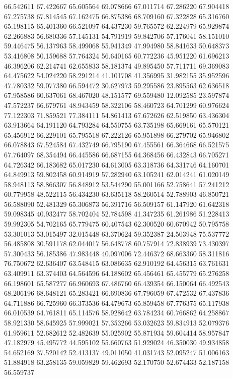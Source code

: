 66.542611
67.422667
65.605564
69.078666
67.011714
67.286220
67.904418
67.275738
67.814545
67.162475
66.875386
68.709160
67.322828
65.316760
65.198115
65.401360
66.521097
64.437230
59.765572
62.224979
65.929874
62.266883
56.680336
57.145131
54.791919
59.842706
57.176041
58.151010
59.446475
56.137963
58.499068
55.941349
47.994980
58.841633
50.648373
53.416808
50.159688
57.764324
56.640165
60.772236
45.951220
61.696213
46.396206
62.214741
62.655833
58.181374
49.895450
57.711711
69.369083
64.475622
54.024220
58.291214
41.101708
41.356995
31.982155
35.952596
47.780332
59.077380
66.594472
30.627973
59.295586
23.895563
62.636518
67.958586
60.637061
68.467020
48.151577
69.559480
12.092585
23.597874
47.572237
66.679761
48.943459
58.322106
58.460723
64.701299
60.976624
77.122303
71.859521
77.384111
54.861413
67.672626
62.519850
63.436304
63.913664
64.191120
64.793284
64.550755
63.735198
65.669161
65.570121
65.456912
66.229101
65.795518
67.222126
65.951898
66.279702
65.946802
66.078843
67.524584
67.432749
66.795190
67.455561
66.364668
66.521575
67.764097
68.354494
66.445586
66.687155
64.368456
66.432843
66.705271
64.726342
66.183682
65.017230
64.613005
63.318736
64.331746
64.160701
64.849913
59.802458
60.914919
57.282940
63.105241
62.014241
61.020149
58.948113
58.866307
56.848912
53.544290
55.001166
52.758641
57.241212
60.779958
48.522115
56.434230
63.635118
58.260514
52.788903
46.850721
56.588090
52.481329
65.306873
56.391716
56.509157
61.147920
61.642318
59.098345
40.932477
58.702404
52.784598
41.347235
61.261986
51.228413
59.992305
54.702165
65.779475
60.407543
62.300520
60.670942
50.795758
53.301013
53.015497
32.015448
63.370624
59.352387
24.503948
75.537772
56.485808
30.591178
62.044017
56.648778
60.757914
72.838939
73.430397
57.300433
56.185386
47.983448
40.097006
72.446372
68.663360
58.311816
76.750672
62.636407
63.548415
63.086635
62.910192
64.456315
63.761631
63.409911
63.374403
64.564596
64.188602
65.456461
65.455779
65.276258
66.198601
65.587277
66.960693
67.486760
66.439354
66.150064
66.492543
68.206196
68.648121
65.283421
66.690836
67.796059
67.472532
67.437836
64.711886
66.725960
66.373536
64.479673
65.859458
67.776375
65.117938
66.010539
64.761811
65.114576
58.928642
63.784234
60.766862
64.258867
58.921330
58.645925
57.999021
57.353266
53.032623
59.834913
52.079376
61.959611
52.682612
52.482639
55.025902
55.871934
59.604414
58.957847
47.182979
45.495772
44.595102
55.660763
51.929024
46.350030
49.934858
54.652169
37.520142
52.413137
49.011050
41.031743
52.095247
51.006163
51.884918
63.258135
59.059829
59.462693
52.170750
52.674433
52.187158
56.559737

